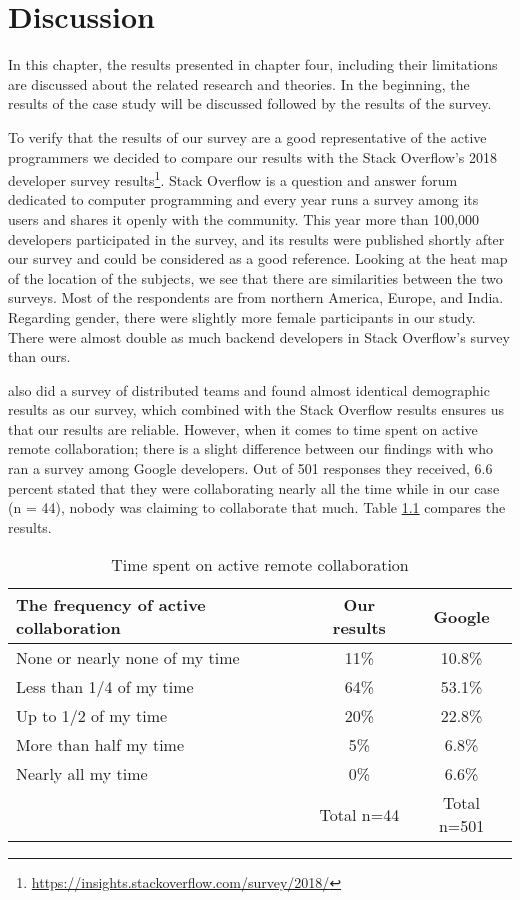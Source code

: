 \chapter{Discussion}

In this chapter, the results presented in chapter four, including their limitations are discussed about the related research and theories. In the beginning, the results of the case study will be discussed followed by the results of the survey.

To verify that the results of our survey are a good representative of the active programmers we decided to compare our results with the Stack Overflow’s 2018 developer survey results\footnote{\url{https://insights.stackoverflow.com/survey/2018/}}. Stack Overflow is a question and answer forum dedicated to computer programming and every year runs a survey among its users and shares it openly with the community. This year more than 100,000 developers participated in the survey, and its results were published shortly after our survey and could be considered as a good reference. 
Looking at the heat map of the location of the subjects, we see that there are similarities between the two surveys. Most of the respondents are from northern America, Europe, and India. Regarding gender, there were slightly more female participants in our study. There were almost double as much backend developers in Stack Overflow’s survey than ours. 

\citet{Stray2017a} also did a survey of distributed teams and found almost identical demographic results as our survey, which combined with the Stack Overflow results ensures us that our results are reliable. 
However, when it comes to time spent on active remote collaboration; there is a slight difference between our findings with \citet{Karis2016} who ran a survey among Google developers. Out of 501 responses they received, 6.6 percent stated that they were collaborating nearly all the time while in our case (n = 44), nobody was claiming to collaborate that much. Table \ref{table:collaboration} compares the results.
    
    
\begin{table}
\centering
\caption{Time spent on active remote collaboration} \label{table:collaboration}
\begin{tabular}{lcc}
\hline
\textbf{The frequency of active collaboration} & \textbf{Our results} & \textbf{Google} \\ \hline
None or nearly none of my time&11\%&10.8\%\\
Less than 1/4 of my time&64\%&53.1\%\\
Up to 1/2 of my time&20\%&22.8\%\\
More than half my time&5\%&6.8\%\\
Nearly all my time&0\%&6.6\%\\
&Total n=44&Total n=501\\
\hline
\end{tabular}
\end{table}

